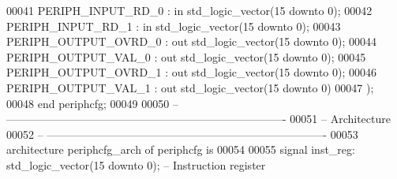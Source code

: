 \begin{DoxyCode}
00041         \textcolor{vhdlchar}{PERIPH_INPUT_RD_0}   \textcolor{vhdlchar}{:} \textcolor{keywordflow}{in} \textcolor{comment}{std\_logic\_vector}\textcolor{vhdlchar}{(}\textcolor{vhdllogic}{}\textcolor{vhdllogic}{15} \textcolor{keywordflow}{downto} \textcolor{vhdllogic}{}\textcolor{vhdllogic}{0}\textcolor{vhdlchar}{)};
00042         \textcolor{vhdlchar}{PERIPH_INPUT_RD_1}   \textcolor{vhdlchar}{:} \textcolor{keywordflow}{in} \textcolor{comment}{std\_logic\_vector}\textcolor{vhdlchar}{(}\textcolor{vhdllogic}{}\textcolor{vhdllogic}{15} \textcolor{keywordflow}{downto} \textcolor{vhdllogic}{}\textcolor{vhdllogic}{0}\textcolor{vhdlchar}{)}; 
00043         \textcolor{vhdlchar}{PERIPH_OUTPUT_OVRD_0} \textcolor{vhdlchar}{:} \textcolor{keywordflow}{out} \textcolor{comment}{std\_logic\_vector}\textcolor{vhdlchar}{(}\textcolor{vhdllogic}{}\textcolor{vhdllogic}{15} \textcolor{keywordflow}{downto} \textcolor{vhdllogic}{}\textcolor{vhdllogic}{0}\textcolor{vhdlchar}{)};   
00044         \textcolor{vhdlchar}{PERIPH_OUTPUT_VAL_0} \textcolor{vhdlchar}{:} \textcolor{keywordflow}{out} \textcolor{comment}{std\_logic\_vector}\textcolor{vhdlchar}{(}\textcolor{vhdllogic}{}\textcolor{vhdllogic}{15} \textcolor{keywordflow}{downto} \textcolor{vhdllogic}{}\textcolor{vhdllogic}{0}\textcolor{vhdlchar}{)};
00045       \textcolor{vhdlchar}{PERIPH_OUTPUT_OVRD_1}  \textcolor{vhdlchar}{:} \textcolor{keywordflow}{out} \textcolor{comment}{std\_logic\_vector}\textcolor{vhdlchar}{(}\textcolor{vhdllogic}{}\textcolor{vhdllogic}{15} \textcolor{keywordflow}{downto} \textcolor{vhdllogic}{}\textcolor{vhdllogic}{0}\textcolor{vhdlchar}{)};
00046       \textcolor{vhdlchar}{PERIPH_OUTPUT_VAL_1}   \textcolor{vhdlchar}{:} \textcolor{keywordflow}{out} \textcolor{comment}{std\_logic\_vector}\textcolor{vhdlchar}{(}\textcolor{vhdllogic}{}\textcolor{vhdllogic}{15} \textcolor{keywordflow}{downto} \textcolor{vhdllogic}{}\textcolor{vhdllogic}{0}\textcolor{vhdlchar}{)} 
00047     \textcolor{vhdlchar}{)};
00048 \textcolor{keywordflow}{end} \textcolor{vhdlchar}{periphcfg};
00049 
00050 \textcolor{keyword}{-- ----------------------------------------------------------------------------}
00051 \textcolor{keyword}{-- Architecture}
00052 \textcolor{keyword}{-- ----------------------------------------------------------------------------}
00053 \textcolor{keywordflow}{architecture} periphcfg\_arch \textcolor{keywordflow}{of} periphcfg is
00054 
00055     \textcolor{keywordflow}{signal} \textcolor{vhdlchar}{inst_reg}\textcolor{vhdlchar}{:} \textcolor{comment}{std\_logic\_vector}\textcolor{vhdlchar}{(}\textcolor{vhdllogic}{}\textcolor{vhdllogic}{15} \textcolor{keywordflow}{downto} \textcolor{vhdllogic}{}\textcolor{vhdllogic}{0}\textcolor{vhdlchar}{)};\textcolor{keyword}{     -- Instruction register}

\end{DoxyCode}
